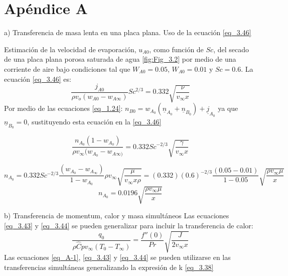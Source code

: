 \newpage
\section* {Apéndice A}
a) Transferencia de masa lenta en una placa plana. Uso de la ecuación \eqref{eq_3.46}
\newline

Estimación de la velocidad de evaporación, $u_{A0}$, como función de $Sc$, del secado de una placa plana porosa saturada de agua \ref{fig:Fig_3.2} por medio de una corriente de aire bajo condiciones tal que $W_{A0}=0.05$, $W_{A0}=0.01$ y $Sc=0.6$.
\newline
La ecuación \eqref{eq_3.46} es:
\begin{equation*}
    \frac{j_{A0}}{\rho v_o(w_{A0}-w_{A\infty})}Sc^{2/3}=0.332\sqrt{\frac{\nu}{v_\infty x}}
\end{equation*}
Por medio de las ecuaciones \eqref{eq_1.24}: $n_{B0}=w_{A_0}(\underline{n}_{A_0}+\underline{n}_{B_0})+\underline{j}_{A_0}$ ya que $\underline{n}_{B_0}=0$, sustituyendo esta ecuación en la \eqref{eq_3.46}

\begin{equation*}
    \frac{n_{A_0}(1-w_{A_0})}{\rho v_\infty (w_{A_0 }-w_{A\infty)}}=0.332Sc^{-2/3}\sqrt{\frac{\gamma}{v_\infty x}}
\end{equation*}

\begin{equation*}
n_{A_0}=0.332Sc^{-2/3}\frac{(w_{A_0}-w_{A_\infty})}{1-w_{A_0}}\rho v_\infty\sqrt{\frac{\mu}{v_\infty x \rho}}=(0.332)(0.6)^{-2/3}\frac{(0.05-0.01)}{1-0.05}\sqrt{\frac{\rho v_\infty \mu}{x}}
\end{equation*}
\begin{equation*}
    n_{A_0}=0.0196 \sqrt{\frac{\rho v_\infty \mu}{x}}
\end{equation*}
\par
b) Transferencia de momentum, calor y masa simultáneos
\newline
Las ecuaciones \eqref{eq_3.43} y \eqref{eq_3.44} se pueden generalizar para incluir la transferencia de calor:
\begin{equation}
    \frac{q_0}{\rho \hat{C}pv_\infty(T_0-T_\infty)}=\frac{f''(0)}{Pr}\sqrt{\frac{J}{2v_\infty x}}
    \tag{A-1}
    \label{eq_A-1}
\end{equation}
Las ecuaciones \eqref{eq_A-1}, \eqref{eq_3.43} y \eqref{eq_3.44} se pueden utilizarse en las transferencias simultáneas generalizando la expresión de k \eqref{eq_3.38}

